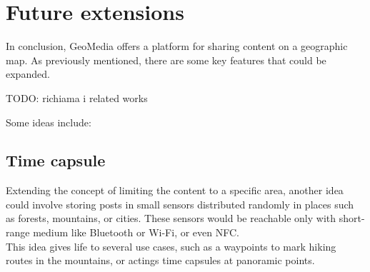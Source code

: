 \documentclass[conference]{IEEEtran}
\begin{document}
\section{Future extensions}

In conclusion, GeoMedia offers a platform for sharing content on a geographic map. As previously mentioned, there are some key features that could be expanded.

TODO: richiama i related works

Some ideas include:

\subsection{Time capsule}

Extending the concept of limiting the content to a specific area, another idea could involve storing posts in small sensors distributed randomly in places such as forests, mountains, or cities. 
These sensors would be reachable only with short-range medium like Bluetooth or Wi-Fi, or even NFC.
\\
This idea gives life to several use cases, such as a waypoints to mark hiking routes in the mountains, or actings time capsules at panoramic points.
\end{document}

